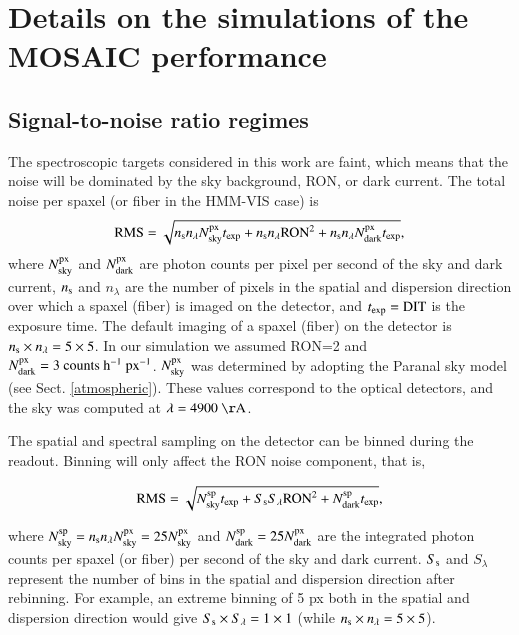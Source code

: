 \documentclass{aa}
\begin{document}
{{{{{{{{{{{{{{\section{Details on the simulations of the MOSAIC performance}

\subsection{Signal-to-noise ratio regimes}
\label{noiseregime}

The spectroscopic targets considered in this work are faint, which means that the noise will be dominated by the sky background, RON, or dark current. The total noise per spaxel (or fiber in the HMM-VIS case) is 
\begin{equation}
{\rm RMS} = \sqrt{n_{\rm s}n_{\lambda}N_{\rm sky}^{\rm px}t_{\rm exp} + n_{\rm s}n_{\lambda}{\rm RON}^2 + n_{\rm s}n_{\lambda}N_{\rm dark}^{\rm px}t_{\rm exp}},
\end{equation}
where $N_{\rm sky}^{\rm px}$ and $N_{\rm dark}^{\rm px}$ are photon counts per pixel per second of the sky and dark current, $n_{\rm s}$ and $n_{\lambda}$ are the number of pixels in the spatial and dispersion direction over which a spaxel (fiber) is imaged on the detector, and $t_{\rm exp} = {\rm DIT}$ is the exposure time. The default imaging of a spaxel (fiber) on the detector is $n_{\rm s}\times n_{\lambda} = 5\times 5$. In our simulation we assumed RON=2 and $N_{\rm dark}^{\rm px} = 3~{\rm counts} ~{\rm h^{-1}} ~{\rm px}^{-1}$. $N_{\rm sky}^{\rm px}$ was determined by adopting the Paranal sky model (see Sect. \ref{atmospheric}). These values correspond to the optical detectors, and the sky was computed at $\lambda = 4900~\mathrm{\AA}$. 

The spatial and spectral sampling on the detector can be binned during the readout. Binning will only affect the RON noise component, that is,

\begin{equation}
{\rm RMS} = \sqrt{N_{\rm sky}^{\rm sp}t_{\rm exp} + S_{\rm s}S_{\lambda}{\rm RON}^2 + N_{\rm dark}^{\rm sp}t_{\rm exp}},
\end{equation}

\noindent where $N_{\rm sky}^{\rm sp} = n_{\rm s}n_{\lambda}N_{\rm sky}^{\rm px} = 25N_{\rm sky}^{\rm px}$ and $N_{\rm dark}^{\rm sp} = 25N_{\rm dark}^{\rm px}$ are the integrated photon counts per spaxel (or fiber) per second of the sky and dark current. $S_{\rm s}$ and $S_{\lambda}$ represent the number of bins in the spatial and dispersion direction after rebinning. For example, an extreme binning of 5 px both in the spatial and dispersion direction would give $S_{\rm s} \times S_{\lambda} = 1\times1$ (while $n_{\rm s}\times n_{\lambda} = 5\times5$).

}}}}}}}}}}}}}}
\end{document}
